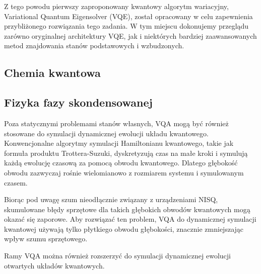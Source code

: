\documentclass[a4paper,11pt]{article}
\begin{document}
Z tego powodu pierwszy zaproponowany kwantowy algorytm wariacyjny, Variational Quantum Eigensolver (VQE), został opracowany w celu zapewnienia przybliżonego rozwiązania tego zadania.  W tym miejscu dokonujemy przeglądu zarówno oryginalnej architektury VQE, jak i niektórych bardziej zaawansowanych metod znajdowania stanów podstawowych i wzbudzonych. 


\subsection{Chemia kwantowa}
\newpage

\subsection{Fizyka fazy skondensowanej}

Poza statycznymi problemami stanów własnych, VQA mogą być również stosowane do symulacji dynamicznej ewolucji układu kwantowego. Konwencjonalne algorytmy symulacji Hamiltonianu kwantowego, takie jak formuła produktu Trottera-Suzuki,  dyskretyzują czas na małe kroki i symulują każdą ewolucję czasową za pomocą obwodu kwantowego. Dlatego głębokość obwodu zazwyczaj rośnie wielomianowo z rozmiarem systemu i symulowanym czasem.

Biorąc pod uwagę szum nieodłącznie związany z urządzeniami NISQ, skumulowane błędy sprzętowe dla takich głębokich obwodów kwantowych mogą okazać się zaporowe. Aby rozwiązać ten problem, VQA do dynamicznej symulacji kwantowej używają tylko płytkiego obwodu głębokości, znacznie zmniejszając wpływ szumu sprzętowego.


Ramy VQA można również rozszerzyć do symulacji dynamicznej ewolucji otwartych układów kwantowych. 
 
 
 
%
\end{document}
